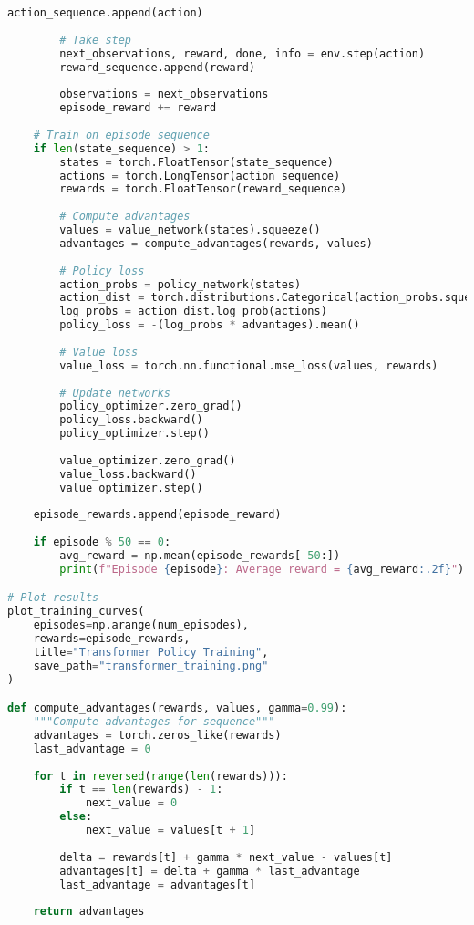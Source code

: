 \begin{lstlisting}[language=python, caption=Transformer Policy Training]
        action_sequence.append(action)
        
        # Take step
        next_observations, reward, done, info = env.step(action)
        reward_sequence.append(reward)
        
        observations = next_observations
        episode_reward += reward
    
    # Train on episode sequence
    if len(state_sequence) > 1:
        states = torch.FloatTensor(state_sequence)
        actions = torch.LongTensor(action_sequence)
        rewards = torch.FloatTensor(reward_sequence)
        
        # Compute advantages
        values = value_network(states).squeeze()
        advantages = compute_advantages(rewards, values)
        
        # Policy loss
        action_probs = policy_network(states)
        action_dist = torch.distributions.Categorical(action_probs.squeeze(-1))
        log_probs = action_dist.log_prob(actions)
        policy_loss = -(log_probs * advantages).mean()
        
        # Value loss
        value_loss = torch.nn.functional.mse_loss(values, rewards)
        
        # Update networks
        policy_optimizer.zero_grad()
        policy_loss.backward()
        policy_optimizer.step()
        
        value_optimizer.zero_grad()
        value_loss.backward()
        value_optimizer.step()
    
    episode_rewards.append(episode_reward)
    
    if episode % 50 == 0:
        avg_reward = np.mean(episode_rewards[-50:])
        print(f"Episode {episode}: Average reward = {avg_reward:.2f}")

# Plot results
plot_training_curves(
    episodes=np.arange(num_episodes),
    rewards=episode_rewards,
    title="Transformer Policy Training",
    save_path="transformer_training.png"
)

def compute_advantages(rewards, values, gamma=0.99):
    """Compute advantages for sequence"""
    advantages = torch.zeros_like(rewards)
    last_advantage = 0
    
    for t in reversed(range(len(rewards))):
        if t == len(rewards) - 1:
            next_value = 0
        else:
            next_value = values[t + 1]
        
        delta = rewards[t] + gamma * next_value - values[t]
        advantages[t] = delta + gamma * last_advantage
        last_advantage = advantages[t]
    
    return advantages
\end{lstlisting}

